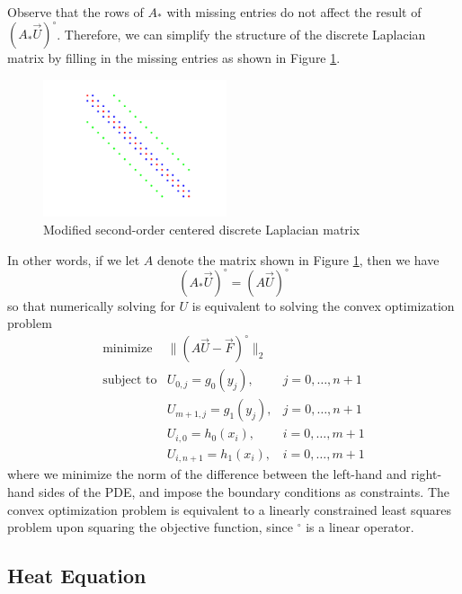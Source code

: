 \documentclass[conference]{IEEEtran}
\begin{document}
Observe that the rows of $A_*$ with missing entries do not affect the result of $(A_* \vec{U})^\circ$. Therefore, we can simplify the structure of the discrete Laplacian matrix by filling in the missing entries as shown in Figure \ref{fig:modified-discrete-laplacian}.
\begin{figure}[t]
  \begin{center}
    \includegraphics[width=0.48\textwidth]{modified-discrete-laplacian}
    \caption{Modified second-order centered discrete Laplacian matrix}
    \label{fig:modified-discrete-laplacian}
  \end{center}
\end{figure}
In other words, if we let $A$ denote the matrix shown in Figure \ref{fig:modified-discrete-laplacian}, then we have
\begin{equation}
  (A_* \vec{U})^\circ = (A \vec{U})^\circ
\end{equation}
so that numerically solving for $U$ is equivalent to solving the convex optimization problem
\begin{equation}
  \begin{array}{lll}
    \text{minimize} & \|(A \vec{U} - \vec{F})^\circ\|_2 \\
    \text{subject to} & U_{0,j} = g_0(y_j), & j = 0,\ldots,n+1 \\
    & U_{m+1,j} = g_1(y_j), & j = 0,\ldots,n+1 \\
    & U_{i,0} = h_0(x_i), & i = 0,\ldots,m+1 \\
    & U_{i,n+1} = h_1(x_i), & i = 0,\ldots,m+1
  \end{array}
\end{equation}
where we minimize the norm of the difference between the left-hand and right-hand sides of the PDE, and impose the boundary conditions as constraints. The convex optimization problem is equivalent to a linearly constrained least squares problem upon squaring the objective function, since ${}^\circ$ is a linear operator.

\subsection{Heat Equation}
\end{document}

